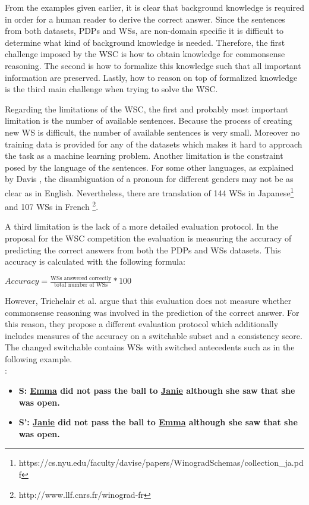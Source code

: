 From the examples given earlier, it is clear that background knowledge is required in order for a human reader to derive the correct answer. Since the sentences from both datasets, PDPs and WSs, are non-domain specific it is difficult to determine what kind of background knowledge is needed. Therefore, the first challenge imposed by the WSC is how to obtain knowledge for commonsense reasoning. 
The second is how to formalize this knowledge such that all important information are preserved. Lastly, how to reason on top of formalized knowledge is the third main challenge when trying to solve the WSC. 

Regarding the limitations of the WSC, the first and probably most important limitation is the number of available sentences. Because the process of creating new WS is difficult, the number of available sentences is very small. Moreover no training data is provided for any of the datasets which makes it hard to approach the task as a machine learning problem. Another limitation is the constraint posed by the language of the sentences. For some other languages, as explained by Davis \cite{DBLP:journals/corr/Davis16}, the disambiguation of a pronoun for different genders may not be as clear as in English. Nevertheless, there are translation of 144 WSs in Japanese\footnote{https://cs.nyu.edu/faculty/davise/papers/WinogradSchemas/collection\_ja.pdf} and 107 WSs in French \footnote{http://www.llf.cnrs.fr/winograd-fr}. 

A third limitation is the lack of a more detailed evaluation protocol. In the proposal for the WSC competition the evaluation is measuring the accuracy of predicting the correct answers from both the PDPs and WSs datasets. This accuracy is calculated with the following formula: \\
\begin{center}
\begin{math}
	Accuracy = \frac{\text{WSs answered correctly}}{\text{total number of WSs}} * 100
\end{math}
\end{center}
However, Trichelair et al. \cite{DBLP:journals/corr/abs-1811-01778} argue that this evaluation does not measure whether commonsense reasoning was involved in the prediction of the correct answer. For this reason, they propose a different evaluation protocol which additionally includes measures of the accuracy on a switchable subset and a consistency score. The changed switchable contains WSs with switched antecedents such as in the following example. \\
:
\begin{itemize} 
	\item \textbf{S: \underline{Emma} did not pass the ball to \underline{Janie} although she saw that she was open.}
	\item \textbf{S': \underline{Janie} did not pass the ball to \underline{Emma} although she saw that she was open.} 
\end{itemize}

